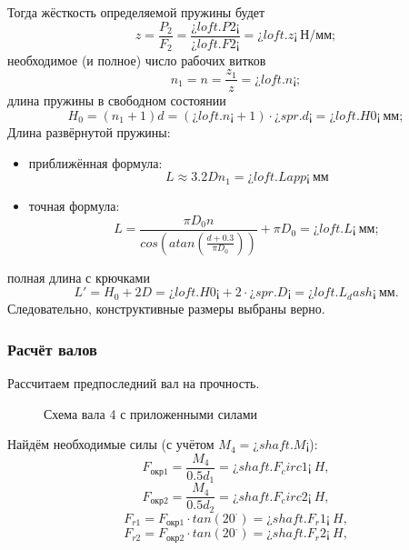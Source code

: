 \documentclass[14pt,a4paper,russian]{scrartcl}
\begin{document}
        Тогда жёсткость определяемой пружины будет
        \[ z = \frac{P_2}{F_2} = \frac{¿loft.P2¡}{¿loft.F2¡} = ¿loft.z¡\ \text{Н/мм}; \]
        необходимое (и полное) число рабочих витков
        \[ n_1 = n = \frac{z_1}{z} = ¿loft.n¡;\]
        длина пружины в свободном состоянии
        \[ H_0 = (n_1 + 1)d = (¿loft.n¡ + 1)\cdot ¿spr.d¡= ¿loft.H0¡\ \text{мм}; \]
        Длина развёрнутой пружины:
        \begin{itemize}
            \item приближённая формула:
                \[ L\approx 3.2Dn_1 = ¿loft.Lapp¡\ \text{мм} \]
            \item точная формула:
                \[ L = \frac{\pi D_0 n}{cos(atan(\frac{d+0.3}{\pi D_0 }))} + \pi D_0 = ¿loft.L¡\ \text{мм};\]
        \end{itemize}
        
        полная длина с крючками
        \[ L' = H_0 + 2D = ¿loft.H0¡ + 2\cdot ¿spr.D¡ = ¿loft.L_dash¡\ \text{мм}. \]
        Следовательно, конструктивные размеры выбраны верно.

    \subsubsection{Расчёт валов}
        Рассчитаем предпоследний вал на прочность. 
        \begin{figure}[h]
            \caption{Схема вала 4 с приложенными силами}
        \end{figure}
        Найдём необходимые силы (с учётом \( M_4 = ¿shaft.M¡ \)):
        \[ F_{\text{окр1}} = \frac{M_4}{0.5d_1} = ¿shaft.F_circ1¡\ H,\]
        \[ F_{\text{окр2}} = \frac{M_4}{0.5d_2} = ¿shaft.F_circ2¡\ H,\]
        \[ F_{r1} = F_{\text{окр1}}\cdot tan(20^\cdot) = ¿shaft.F_r1¡\ H,\]
        \[ F_{r2} = F_{\text{окр2}}\cdot tan(20^\cdot) = ¿shaft.F_r2¡\ H,\]
\end{document}
